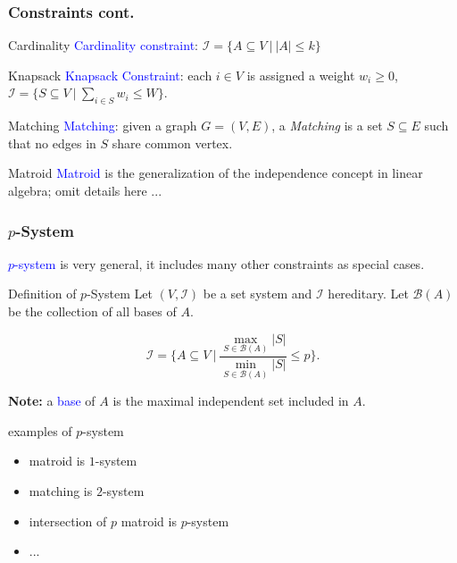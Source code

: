 \documentclass{beamer}
\newcommand{\calI}{\mathcal{I}}
\newcommand{\emRed}[1][]{\textcolor{blue} #1}
\begin{document}
\begin{frame}
  \frametitle{Constraints cont.}
  \begin{block}{Cardinality}
    \emRed{Cardinality constraint}: $\calI = \{A \subseteq V ~|~ |A| \leq k\}$
  \end{block}

  \begin{block}{Knapsack}
   \emRed{Knapsack Constraint}: each $i \in V$ is assigned a weight $w_i \geq 0$,  $\calI = \{S \subseteq V ~|~ \sum_{i\in S} w_i \leq W \}$.
  \end{block}

  \pause

  \begin{block}{Matching}
     \emRed{Matching}: given a graph $G = (V, E)$, a \emph{Matching} is a set $S\subseteq E$ such that no edges in $S$ share common vertex.
  \end{block}

  \begin{block}{Matroid}
    \emRed{Matroid} is the generalization of the independence concept in linear algebra;
    omit details here ...
  \end{block}


\end{frame}




\begin{frame}
  \frametitle{$p$-System}
\emRed{$p$-system} is very general, it includes many other constraints as special cases.

\begin{block}{Definition of $p$-System}
Let $(V, \calI)$ be a set system and $\calI$ hereditary.  Let $\mathcal{B}(A)$ be the collection of all bases of $A$.

$$\calI = \{ A \subseteq V ~|~ \frac{\max_{S\in\mathcal{B}(A)}|S|}{\min_{S\in\mathcal{B}(A)}|S|} \leq p \}.$$
\end{block}
\pause
\textbf{Note:} a \emRed{base} of $A$ is the maximal independent set included in $A$. 
\pause
\begin{block}{examples of $p$-system}
  \begin{itemize}
    \item matroid is $1$-system
    \item matching is $2$-system
    \item intersection of $p$ matroid is $p$-system
    \item ...
  \end{itemize}
\end{block}
\end{frame}
\end{document}
